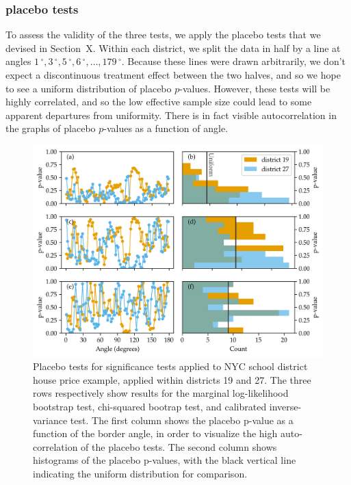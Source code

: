 \documentclass[letter]{article}
\makeatletter
\def\maxwidth{\ifdim\Gin@nat@width>\linewidth\linewidth
\else\Gin@nat@width\fi}
\let\Oldincludegraphics\includegraphics
\renewcommand{\includegraphics}[1]{\Oldincludegraphics[width=1.0\maxwidth]{#1}}
\newcommand{\degree}{{\,^\circ}}
\makeatother
\begin{document}
    	\subsubsection{placebo tests}\label{placebo-tests}

To assess the validity of the three tests, we apply the placebo tests that we devised in Section~X.
Within each district, we split the data in half by a line at angles \(1\degree,3\degree,5\degree,6\degree,\ldots,179\degree\).
Because these lines were drawn arbitrarily, we don't expect a discontinuous treatment effect between the two halves, and so we hope to see a uniform distribution of placebo \(p\)-values.
However, these tests will be highly correlated,
and so the low effective sample size could lead to some apparent departures from uniformity.
There is in fact visible autocorrelation in the graphs of placebo \(p\)-values as a function of angle.

\begin{figure}
\centering
\includegraphics{../NYC/NYC_plots/NYC_placebos.png}
\caption{\label{fig:nyc_placebos} Placebo tests for significance tests applied to NYC school district house price example, applied within districts 19 and 27. The three rows respectively show results for the marginal log-likelihood bootstrap test, chi-squared bootrap test, and calibrated inverse-variance test. The first column shows the placebo p-value as a function of the border angle, in order to visualize the high auto-correlation of the placebo tests. The second column shows histograms of the placebo p-values, with the black vertical line indicating the uniform distribution for comparison.}
\end{figure}
\end{document}
